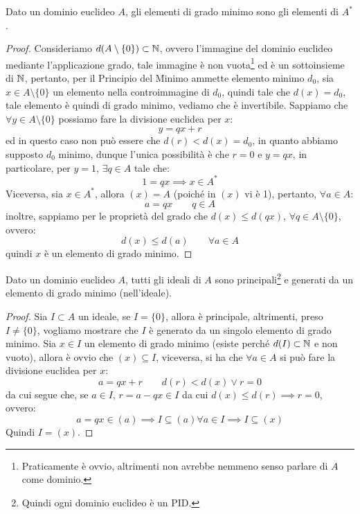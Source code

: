 \documentclass[11pt]{scrartcl}
\begin{document}
\begin{proposition}
    Dato un dominio euclideo $A$, gli elementi di grado minimo sono gli elementi di $A^*$.
\end{proposition}

\begin{proof}
    Consideriamo $d(A\setminus\{0\}) \subset \mathbb N$, ovvero l'immagine del dominio euclideo mediante l'applicazione grado, tale immagine è non vuota\footnote{Praticamente è ovvio, altrimenti non avrebbe nemmeno senso
    parlare di $A$ come dominio.} ed è un sottoinsieme di $\mathbb N$, pertanto, per il Principio del Minimo ammette elemento minimo $d_0$, sia $x \in A\setminus\{0\}$ un elemento nella controimmagine di $d_0$, quindi
    tale che $d(x) = d_0$, tale elemento è quindi di grado minimo, vediamo che è invertibile. Sappiamo che $\forall y \in A\setminus\{0\}$ possiamo fare la divisione euclidea per $x$:
    \[ y = qx + r
        \]
    ed in questo caso non può essere che $d(r) < d(x) = d_0$, in quanto abbiamo supposto $d_0$ minimo, dunque l'unica possibilità è che $r = 0$ e $y = qx$, in particolare, per $y = 1$, $\exists q \in A$ tale che:
    \[ 1 = qx \implies x \in A^*
        \]
    Viceversa, sia $x \in A^*$, allora $(x) = A$ (poiché in $(x)$ vi è 1), pertanto, $\forall a \in A$:
    \[ a = qx \qquad q \in A
        \]
    inoltre, sappiamo per le proprietà del grado che $d(x) \leq d(qx)$, $\forall q \in A\setminus\{0\}$, ovvero:
    \[ d(x) \leq d(a) \qquad \forall a \in A
        \]
    quindi $x$ è un elemento di grado minimo.
\end{proof}

\begin{proposition}
    \label{2.93}
    Dato un dominio euclideo $A$, tutti gli ideali di $A$ sono principali\footnote{Quindi ogni dominio euclideo è un PID.} e generati da un elemento di grado minimo (nell'ideale).
\end{proposition}

\begin{proof}
    Sia $I \subset A$ un ideale, se $I = \{0\}$, allora è principale, altrimenti, preso $I \ne \{0\}$, vogliamo mostrare che $I$ è generato da un singolo elemento di grado minimo.
    Sia $x \in I$ un elemento di grado minimo (esiste perché $d(I) \subset \mathbb N$ e non vuoto), allora è ovvio che $(x) \subseteq I$, viceversa, si ha che $\forall a \in A$ si può fare la divisione euclidea per $x$:
    \[ a = qx + r \qquad d(r) < d(x) \vee r = 0
        \]
    da cui segue che, se $a \in I$, $r = a - qx \in I$ da cui $d(x) \leq d(r) \implies r = 0$, ovvero:
    \[ a = qx \in (a) \implies I \subseteq (a) \forall a \in I \implies I \subseteq (x)
        \]
    Quindi $I = (x)$.
\end{proof}
\end{document}
